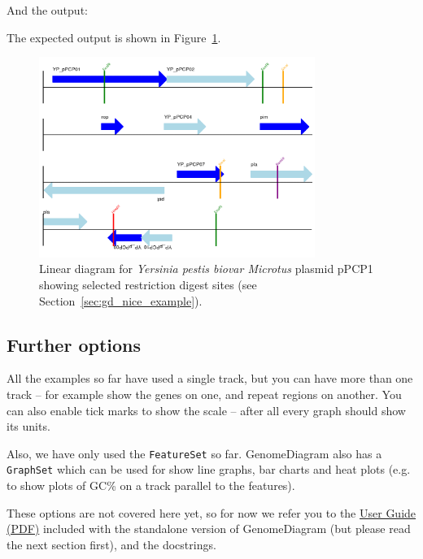 \documentclass{report}
\begin{document}
\begin{htmlonly}
\noindent And the output:


\end{htmlonly}
\begin{latexonly}
\noindent The expected output is shown in Figure~\ref{fig:plasmid_linear_nice}.
\begin{figure}[htbp]
\centering
\includegraphics[width=0.8\textwidth]{images/plasmid_linear_nice.png}
\caption{Linear diagram for \textit{Yersinia pestis biovar Microtus} plasmid
pPCP1 showing selected restriction digest sites (see
Section~\ref{sec:gd_nice_example}).}
\label{fig:plasmid_linear_nice}
\end{figure}
\end{latexonly}

\subsection{Further options}

All the examples so far have used a single track, but you can have more than
one track -- for example show the genes on one, and repeat regions on another.
You can also enable tick marks to show the scale -- after all every graph
should show its units.

Also, we have only used the \verb|FeatureSet| so far. GenomeDiagram also has
a \verb|GraphSet| which can be used for show line graphs, bar charts and heat
plots (e.g. to show plots of GC\% on a track parallel to the features).

These options are not covered here yet, so for now we refer you to the
\href{http://bioinf.scri.ac.uk/lp/downloads/programs/genomediagram/userguide.pdf}
{User Guide (PDF)} included with the standalone version of GenomeDiagram (but
please read the next section first), and the docstrings.
\end{document}
